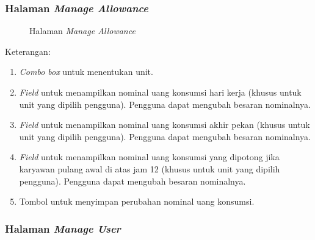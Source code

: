 
\subsubsection{Halaman \textit{Manage Allowance}}
\label{sec:page4}

\begin{figure}[H]
	\centering
	\caption{Halaman \textit{Manage Allowance}}
	\label{fig:page4}
\end{figure}	

Keterangan:
\begin{enumerate}
	\item \textit{Combo box} untuk menentukan unit.
	\item \textit{Field} untuk menampilkan nominal uang konsumsi hari kerja (khusus untuk unit yang dipilih pengguna). Pengguna dapat mengubah besaran nominalnya.
	\item \textit{Field} untuk menampilkan nominal uang konsumsi akhir pekan (khusus untuk unit yang dipilih pengguna). Pengguna dapat mengubah besaran nominalnya.
	\item \textit{Field} untuk menampilkan nominal uang konsumsi yang dipotong jika karyawan pulang awal di atas jam 12 (khusus untuk unit yang dipilih pengguna). Pengguna dapat mengubah besaran nominalnya.
	\item Tombol untuk menyimpan perubahan nominal uang konsumsi.
\end{enumerate}


\subsubsection{Halaman \textit{Manage User}}
\label{sec:page5}

